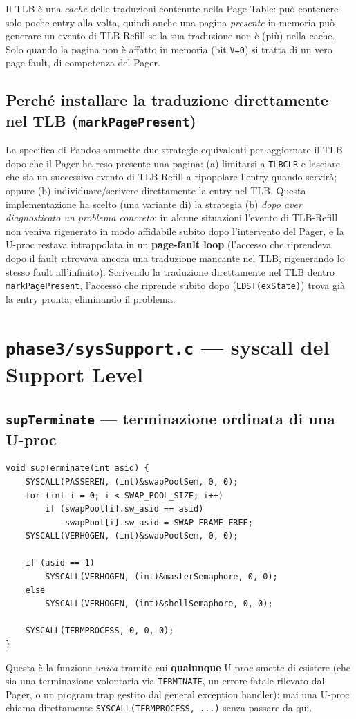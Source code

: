 \documentclass[11pt,a4paper]{article}
\newcommand{\code}[1]{\texttt{#1}}
\newcommand{\func}[1]{\textbf{\texttt{#1}}}
\begin{document}
Il TLB è una \emph{cache} delle traduzioni contenute nella Page Table: può
contenere solo poche entry alla volta, quindi anche una pagina
\emph{presente} in memoria può generare un evento di TLB-Refill se la sua
traduzione non è (più) nella cache. Solo quando la pagina non è affatto in
memoria (bit \code{V=0}) si tratta di un vero page fault, di competenza del
Pager.

\subsection{Perché installare la traduzione direttamente nel TLB
(\code{markPagePresent})}
La specifica di Pandos ammette due strategie equivalenti per aggiornare il
TLB dopo che il Pager ha reso presente una pagina: (a) limitarsi a
\code{TLBCLR} e lasciare che sia un successivo evento di TLB-Refill a
ripopolare l'entry quando servirà; oppure (b) individuare/scrivere
direttamente la entry nel TLB. Questa implementazione ha scelto (una
variante di) la strategia (b) \emph{dopo aver diagnosticato un problema
concreto}: in alcune situazioni l'evento di TLB-Refill non veniva
rigenerato in modo affidabile subito dopo l'intervento del Pager, e la
U-proc restava intrappolata in un \textbf{page-fault loop} (l'accesso che
riprendeva dopo il fault ritrovava ancora una traduzione mancante nel TLB,
rigenerando lo stesso fault all'infinito). Scrivendo la traduzione
direttamente nel TLB dentro \code{markPagePresent}, l'accesso che riprende
subito dopo (\code{LDST(exState)}) trova già la entry pronta, eliminando il
problema.

\section{\code{phase3/sysSupport.c} --- syscall del Support Level}
\label{sec:syssupport-fase3}

\subsection{\func{supTerminate} --- terminazione ordinata di una U-proc}
\begin{lstlisting}
void supTerminate(int asid) {
    SYSCALL(PASSEREN, (int)&swapPoolSem, 0, 0);
    for (int i = 0; i < SWAP_POOL_SIZE; i++)
        if (swapPool[i].sw_asid == asid)
            swapPool[i].sw_asid = SWAP_FRAME_FREE;
    SYSCALL(VERHOGEN, (int)&swapPoolSem, 0, 0);

    if (asid == 1)
        SYSCALL(VERHOGEN, (int)&masterSemaphore, 0, 0);
    else
        SYSCALL(VERHOGEN, (int)&shellSemaphore, 0, 0);

    SYSCALL(TERMPROCESS, 0, 0, 0);
}
\end{lstlisting}
Questa è la funzione \emph{unica} tramite cui \textbf{qualunque} U-proc
smette di esistere (che sia una terminazione volontaria via \code{TERMINATE},
un errore fatale rilevato dal Pager, o un program trap gestito dal general
exception handler): mai una U-proc chiama direttamente
\code{SYSCALL(TERMPROCESS, ...)} senza passare da qui.
\end{document}
